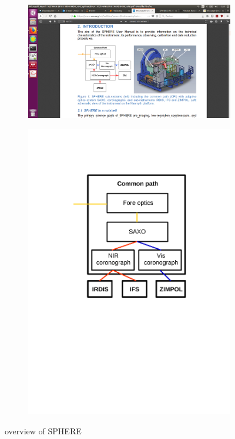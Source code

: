 \documentclass[twoside,single]{lion-msc}
\begin{document}
\begin{figure}[hb]
\centering
\begin{subfigure}{.6\textwidth}
  \centering
  \includegraphics[trim={25cm 6cm 7cm 8.8cm},clip,width = 1\linewidth]{overviewSPHERE}
  \caption{\citep{Observatory2007}}
\end{subfigure}%
\begin{subfigure}{.4\textwidth}
  \centering
  \includegraphics[trim={5cm 12cm 3.5cm 3.5cm},clip,width=1\linewidth]{overview_SPHERE}
  \caption{}
\end{subfigure}
\caption{overview of SPHERE}
\label{fig:overviewSPHERE}
\end{figure}
\end{document}
